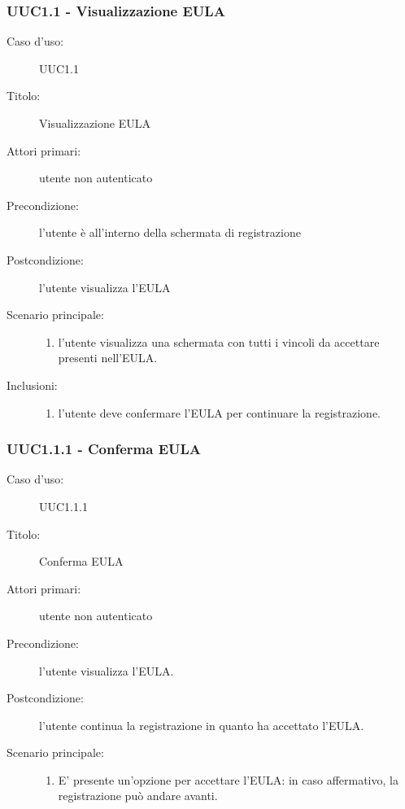 \documentclass[casi-duso]{subfiles}
\begin{document}
\subsubsection{UUC1.1 - Visualizzazione EULA}%
\label{subsub:UUC1.1utente}
\begin{description}
  \item[Caso d’uso:] UUC1.1
  \item[Titolo:] Visualizzazione EULA
  \item[Attori primari:] utente non autenticato
  \item[Precondizione:] l'utente è all'interno della schermata di registrazione
  \item[Postcondizione:] l'utente visualizza l'EULA
  \item[Scenario principale:]
        \begin{enumerate}
          \item l'utente visualizza una schermata con tutti i vincoli da accettare presenti nell'EULA.
        \end{enumerate}
  \item[Inclusioni:]
        \begin{enumerate}
          \item l'utente deve confermare l'EULA per continuare la registrazione.
        \end{enumerate}
\end{description}

\subsubsection{UUC1.1.1 - Conferma EULA}%
\label{subsub:UUC1.1.1utente}
\begin{description}
  \item[Caso d’uso:] UUC1.1.1
  \item[Titolo:] Conferma EULA
  \item[Attori primari:] utente non autenticato
  \item[Precondizione:] l'utente visualizza l'EULA.
  \item[Postcondizione:] l'utente continua la registrazione in quanto ha accettato l'EULA.
  \item[Scenario principale:]
        \begin{enumerate}
          \item E' presente un'opzione per accettare l'EULA: in caso affermativo, la registrazione può andare avanti.
        \end{enumerate}
\end{description}
\end{document}
